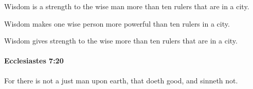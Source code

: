 			\begin{versebox}
					\item[BHS] 
					\item[LXX] 
					\item[ASV] Wisdom is a strength to the wise man more than ten rulers that are in a city.
					\item[NIV] Wisdom makes one wise person more powerful than ten rulers in a city.
					\item[NRSV] Wisdom gives strength to the wise more than ten rulers that are in a city.
			\end{versebox}

		\paragraph{Ecclesiastes 7:20} %
			\label{ECCLESIASTES-7-20}

			For there is not a just man upon earth, that doeth good, and sinneth not.


